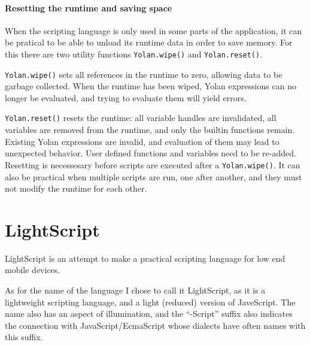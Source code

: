 \documentclass[11pt]{report}
\begin{document}
\subsubsection{Resetting the runtime and saving space}
When the scripting language is only used in some parts of the application, it can be pratical to be able to unload its runtime data in order to save memory. 
For this there are two utility functions \verb|Yolan.wipe()| and \verb|Yolan.reset()|.

\verb|Yolan.wipe()| sets all references in the runtime to zero, allowing data to be garbage collected.
When the runtime has been wiped, Yolan expressions can no longer be evaluated, and trying to evaluate them will yield errors. 

\verb|Yolan.reset()| resets the runtime: all variable handles are invalidated, all variables are removed from the runtime, and only the builtin functions remain. Existing Yolan expressions are invalid, and evaluation of them may lead to unexpected behavior. User defined functions and variables need to be re-added.
Resetting is necessesary before scripts are executed after a \verb|Yolan.wipe()|.
It can also be practical when multiple scripts are run, one after another, and they must not modify the runtime for each other.

\chapter{LightScript}
\label{lightscript}

LightScript is an attempt to make a practical scripting language for low end mobile devices.


As for the name of the language I chose to call it LightScript, as it is a lightweight scripting language, and a light (reduced) version of JaveScript. The name also has an aspect of illumination, and the ``-Script'' suffix also indicates the connection with JavaScript/EcmaScript whose dialects have often names with this suffix.


\end{document}
